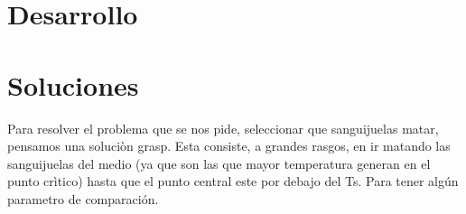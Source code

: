 \section{Desarrollo}

\section{Soluciones}

Para resolver el problema que se nos pide, seleccionar que sanguijuelas matar, pensamos una soluciòn grasp. Esta consiste, a grandes rasgos, en ir matando las sanguijuelas del medio (ya que son las que mayor temperatura generan en el punto crìtico) hasta que el punto central este por debajo del Ts. Para tener algún parametro de comparación.















